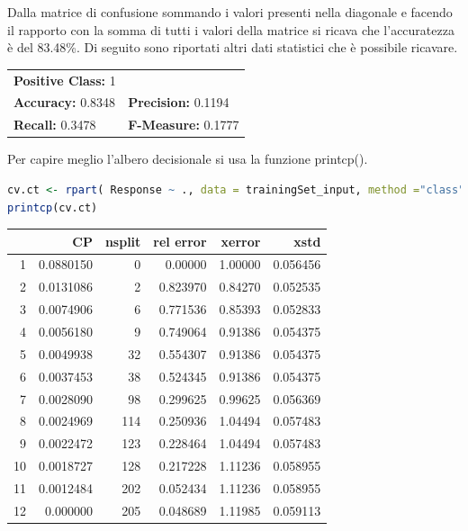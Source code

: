 \documentclass[letterpaper,11pt]{article}
\begin{document}
Dalla matrice di confusione sommando i valori presenti nella diagonale e facendo il rapporto con la somma di tutti i valori della matrice si ricava che l'accuratezza è del 83.48\%.
Di seguito sono riportati altri dati statistici che è possibile ricavare. 

\begin{table}[h!]
\centering
\begin{tabular}{ll}
\multicolumn{2}{l}{\textbf{Positive Class:} 1} \\
\textbf{Accuracy:} 0.8348 & \textbf{Precision:} 0.1194\\
\textbf{Recall:} 0.3478 & \textbf{F-Measure:} 0.1777
\end{tabular}
\end{table}

Per capire meglio l'albero decisionale si usa la funzione printcp().

\begin{lstlisting}[language=R]
cv.ct <- rpart( Response ~ ., data = trainingSet_input, method ="class", cp = 0, minsplit = 2, xval = 10)
printcp(cv.ct)
\end{lstlisting}

\begin{table}[ht]
\centering
\begin{tabular}{rrrrrr}
  \hline
 & CP & nsplit & rel error & xerror & xstd \\ 
  \hline
1 & 0.0880150 & 0 & 0.00000 & 1.00000 & 0.056456 \\ 
  2 & 0.0131086 & 2 & 0.823970 & 0.84270 & 0.052535 \\ 
  3 & 0.0074906 & 6 & 0.771536 & 0.85393 & 0.052833 \\ 
  4 & 0.0056180 & 9 & 0.749064 & 0.91386 & 0.054375 \\ 
  5 & 0.0049938 & 32 & 0.554307 & 0.91386 & 0.054375 \\ 
  6 & 0.0037453 & 38 & 0.524345 & 0.91386 & 0.054375 \\ 
  7 & 0.0028090 & 98 & 0.299625 & 0.99625 & 0.056369 \\ 
  8 & 0.0024969 & 114 & 0.250936 & 1.04494 & 0.057483 \\ 
  9 & 0.0022472 & 123 & 0.228464 & 1.04494 & 0.057483 \\ 
  10 & 0.0018727 & 128 & 0.217228 & 1.11236 & 0.058955 \\ 
  11 & 0.0012484 & 202 & 0.052434 & 1.11236 & 0.058955 \\ 
  12 & 0.000000 & 205 & 0.048689 & 1.11985 & 0.059113 \\ 
   \hline
\end{tabular}
\end{table}
\end{document}
